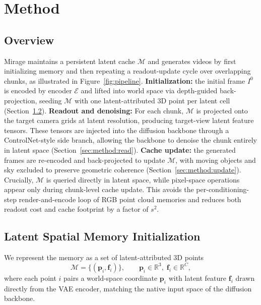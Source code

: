\documentclass{llmxive}
\begin{document}
\section{Method}
\label{sec:method}

\subsection{Overview}
\label{sec:method:principle}

Mirage maintains a persistent latent cache $\mathcal{M}$ and generates videos by first initializing memory and then repeating a readout-update cycle over overlapping chunks,
as illustrated in Figure~\ref{fig:pipeline}.
\textbf{Initialization:} the initial frame $I^0$ is encoded by encoder $\mathcal{E}$ and lifted
into world space via depth-guided back-projection, seeding $\mathcal{M}$
with one latent-attributed 3D point per latent cell
(Section~\ref{sec:method:mem}).
\textbf{Readout and denoising:}
For each chunk, $\mathcal{M}$ is projected onto the target camera grids at latent resolution, producing target-view latent feature tensors. 
These tensors are injected into the diffusion backbone through a ControlNet-style side branch, allowing the backbone to denoise the chunk entirely in latent space
(Section~\ref{sec:method:read}).
\textbf{Cache update:} the generated frames  are re-encoded and back-projected to update
$\mathcal{M}$, with moving objects and sky excluded to preserve geometric
coherence (Section~\ref{sec:method:update}).
Crucially, $\mathcal{M}$ is queried directly in latent space, while
pixel-space operations appear only during chunk-level cache update. This
avoids the per-conditioning-step render-and-encode loop of RGB point cloud
memories and reduces both readout cost and cache footprint by a factor of
$s^2$.










\subsection{Latent Spatial Memory Initialization}
\label{sec:method:mem}


We represent the memory as a set of latent-attributed 3D points
\begin{equation}
\mathcal{M} = \bigl\{(\mathbf{p}_i, \mathbf{f}_i)\bigr\},
\qquad \mathbf{p}_i \in \mathbb{R}^{3},\; \mathbf{f}_i \in \mathbb{R}^{C},
\label{eq:lat-mem}
\end{equation}
where each point $i$ pairs a world-space coordinate $\mathbf{p}_i$ with
latent feature $\mathbf{f}_i$ drawn directly from the VAE encoder, matching the native
input space of the diffusion backbone.
\end{document}
